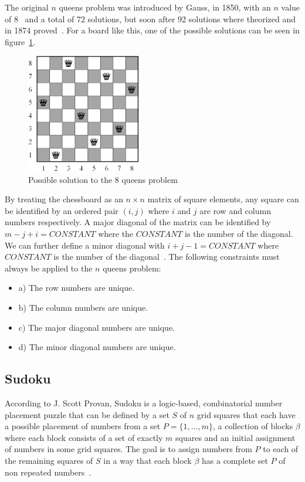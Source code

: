 The original $n$ queens problem was introduced by Gauss, in 1850, with an $n$ value of 8~\cite{hoffman1969constructions} and a total of 72 solutions, but soon after 92 solutions where theorized and in 1874 proved~\cite{rivin1994n}. For a board like this, one of the possible solutions can be seen in figure~\ref{fig:queens}.

\begin{figure}[hb]
    \centering
    \includegraphics[width=50mm]{queens.png}
    \caption{Possible solution to the 8 queens problem}
    \label{fig:queens}
\end{figure}

By treating the chessboard as an $n \times n$ matrix of square elements, any square can be identified by an ordered pair $(i, j)$ where $i$ and $j$ are row and column numbers respectively. A major diagonal of the matrix can be identified by $m-j+i = CONSTANT$ where the $CONSTANT$ is the number of the diagonal. We can further define a minor diagonal with $i+j-1 = CONSTANT$ where $CONSTANT$ is the number of the diagonal~\cite{hoffman1969constructions}. 
The following constraints must always be applied to the $n$ queens problem:
\begin{itemize}
    \item a) The row numbers are unique.
    \item b) The column numbers are unique.
    \item c) The major diagonal numbers are unique.
    \item d) The minor diagonal numbers are unique.
\end{itemize}

\subsection{Sudoku}

According to J. Scott Provan, Sudoku is a logic-based, combinatorial number placement puzzle that can be defined by a set $S$ of $n$ grid squares that each have a possible placement of numbers from a set $P=\{1,\ldots,m\}$, a collection of blocks $\beta$ where each block consists of a set of exactly $m$ squares and an initial assignment of numbers in some grid squares. The goal is to assign numbers from $P$ to each of the remaining squares of $S$ in a way that each block $\beta$ has a complete set $P$ of non repeated numbers~\cite{provan2009sudoku}.


